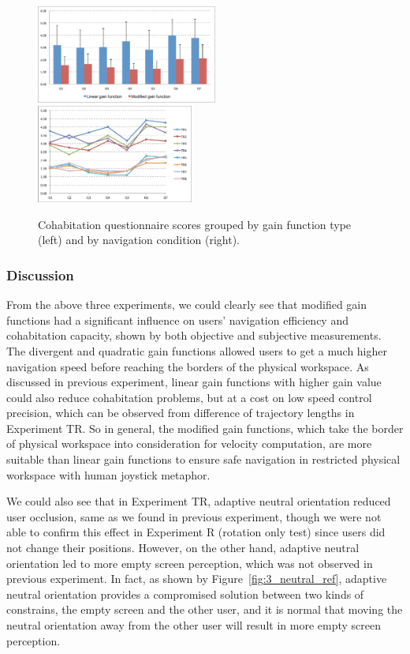 \begin{figure}[tb]
  \centering
  \includegraphics[width=0.53\textwidth]{figures/3_qn_bar}
  \includegraphics[width=0.46\textwidth]{figures/3_qn_line}
  \caption{\label{fig:3_questionnaire}Cohabitation questionnaire scores grouped by gain function type (left) and by navigation condition (right).}
\end{figure}

\subsubsection{Discussion}
From the above three experiments, we could clearly see that modified gain functions had a significant influence on users' navigation efficiency and cohabitation capacity, shown by both objective and subjective measurements. The divergent and quadratic gain functions allowed users to get a much higher navigation speed before reaching the borders of the physical workspace. As discussed in previous experiment, linear gain functions with higher gain value could also reduce cohabitation problems, but at a cost on low speed control precision, which can be observed from difference of trajectory lengths in Experiment TR. So in general, the modified gain functions, which take the border of physical workspace into consideration for velocity computation, are more suitable than linear gain functions to ensure safe navigation in restricted physical workspace with human joystick metaphor.

We could also see that in Experiment TR, adaptive neutral orientation reduced user occlusion, same as we found in previous experiment, though we were not able to confirm this effect in Experiment R (rotation only test) since users did not change their positions. However, on the other hand, adaptive neutral orientation led to more empty screen perception, which was not observed in previous experiment. In fact, as shown by Figure~\ref{fig:3_neutral_ref}, adaptive neutral orientation provides a compromised solution between two kinds of constrains, the empty screen and the other user, and it is normal that moving the neutral orientation away from the other user will result in more empty screen perception.

